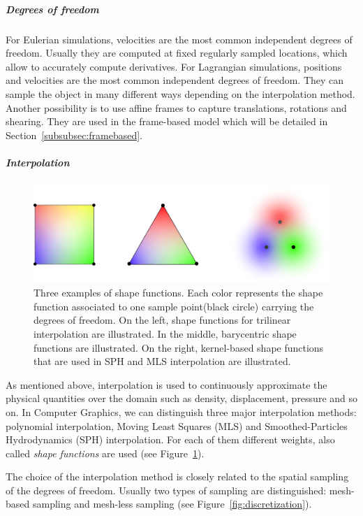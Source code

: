 \subparagraph{Degrees of freedom}
For Eulerian simulations, velocities are the most common independent degrees of freedom. 
Usually they are computed at fixed regularly sampled locations, which allow to accurately compute derivatives. 
For Lagrangian simulations, positions and velocities are the most common independent degrees of freedom.
They can sample the object in many different ways depending on the interpolation method.
Another possibility is to use affine frames to capture translations, rotations and shearing.
They are used in the frame-based model which will be detailed in Section~\ref{subsubsec:framebased}. 

\subparagraph{Interpolation}

\begin{figure}[!ht]
\centering
\includegraphics[scale=0.5]{images/continuum_mechanics/shapefunction.png}
\caption[STAR mechanics: Shape functions]{\label{fig:shapefunction} 
	Three examples of shape functions. 
	Each color represents the shape function associated to one sample point(black circle) carrying the degrees of freedom. 
	On the left, shape functions for trilinear interpolation are illustrated. 
	In the middle, barycentric shape functions are illustrated. 
	On the right, kernel-based shape functions that are used in SPH and MLS interpolation are illustrated.}
\end{figure}

As mentioned above, interpolation is used to continuously approximate the physical quantities over the domain such as density, displacement, pressure and so on. In Computer Graphics, we can distinguish three major interpolation methods: polynomial interpolation, Moving Least Squares (MLS) and Smoothed-Particles Hydrodynamics (SPH) interpolation. For each of them different weights, also called \emph{shape functions} are used (see Figure~\ref{fig:shapefunction}). 

The choice of the interpolation method is closely related to the spatial sampling of the degrees of freedom. 
Usually two types of sampling are distinguished: mesh-based sampling and mesh-less sampling (see Figure~\ref{fig:discretization}).

